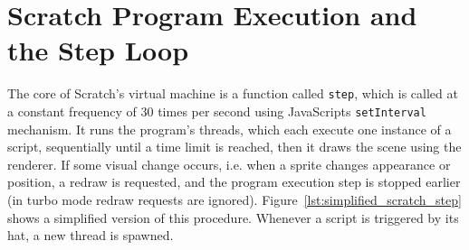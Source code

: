 \section{Scratch Program Execution and the Step Loop}
\label{sec:scratch_program_execution_and_the_step_loop}

The core of Scratch's virtual machine is a function called \texttt{step},
which is called at a constant frequency of 30 times per second using JavaScripts \texttt{setInterval} mechanism.
It runs the program's threads, which each execute one instance of a script, sequentially until a time limit is reached, then it draws the scene using the renderer.
If some visual change occurs, i.e. when a sprite changes appearance or position, a redraw is requested,
and the program execution step is stopped earlier (in turbo mode redraw requests are ignored).
Figure~\ref{lst:simplified_scratch_step} shows a simplified version of this procedure.
Whenever a script is triggered by its hat, a new thread is spawned.
\parspace

